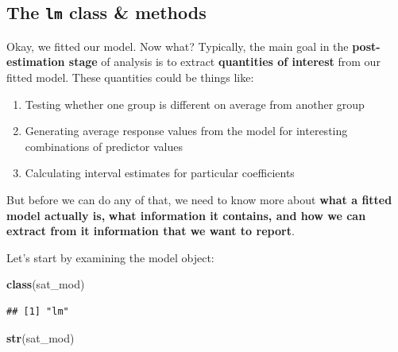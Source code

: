 \documentclass[]{book}
\newenvironment{Shaded}{\begin{snugshade}}{\end{snugshade}}
\newcommand{\KeywordTok}[1]{\textcolor[rgb]{0.13,0.29,0.53}{\textbf{#1}}}
\newcommand{\NormalTok}[1]{#1}
\providecommand{\tightlist}{%
  \setlength{\itemsep}{0pt}\setlength{\parskip}{0pt}}
\begin{document}
\hypertarget{the-lm-class-methods}{%
\subsection{\texorpdfstring{The \texttt{lm} class \& methods}{The lm class \& methods}}\label{the-lm-class-methods}}

Okay, we fitted our model. Now what? Typically, the main goal in the \textbf{post-estimation stage} of analysis
is to extract \textbf{quantities of interest} from our fitted model. These quantities could be things like:

\begin{enumerate}
\def\labelenumi{\arabic{enumi}.}
\tightlist
\item
  Testing whether one group is different on average from another group
\item
  Generating average response values from the model for interesting combinations of predictor values
\item
  Calculating interval estimates for particular coefficients
\end{enumerate}

But before we can do any of that, we need to know more about \textbf{what a fitted model actually is,}
\textbf{what information it contains, and how we can extract from it information that we want to report}.

Let's start by examining the model object:

\begin{Shaded}
\begin{Highlighting}[]
  \KeywordTok{class}\NormalTok{(sat_mod)}
\end{Highlighting}
\end{Shaded}

\begin{verbatim}
## [1] "lm"
\end{verbatim}

\begin{Shaded}
\begin{Highlighting}[]
  \KeywordTok{str}\NormalTok{(sat_mod)}
\end{Highlighting}
\end{Shaded}
\end{document}
